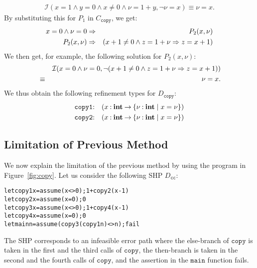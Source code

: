 \begin{eqnarray*}
\mathcal{I}(x=1 \land y=0 \land x\neq0 \land \nu=1+y,\neg \nu=x)
\equiv \nu=x.
\end{eqnarray*}
By substituting this for \(P_1\) in \(C_{\texttt{copy}}\), we get:
\begin{eqnarray*}
x=0 \land \nu=0 &\Rightarrow& P_2(x,\nu) \\
P_2(x,\nu) &\Rightarrow& (x+1\neq0 \land z=1+\nu \Rightarrow z=x+1)
\end{eqnarray*}
We then get, for example, the following solution for \(P_2(x,\nu)\):
\begin{eqnarray*}
&&\mathcal{I}(x=0 \land \nu=0,\neg (x+1\neq0 \land z=1+\nu \Rightarrow z=x+1)) \\
&\equiv& \nu=x.
\end{eqnarray*}
We thus obtain the following refinement types for \(D_{\texttt{copy}}\):
\begin{eqnarray*}
\texttt{copy1}&\mathbin{:}&(x\mathbin{:}{\mathbf{int}}\mathbin{\rightarrow}{\{{\nu\mathbin{:}\mathbf{int} \mid x=\nu}\}}) \\
\texttt{copy2}&\mathbin{:}&(x\mathbin{:}{\mathbf{int}}\mathbin{\rightarrow}{\{{\nu\mathbin{:}\mathbf{int} \mid x=\nu}\}})
\end{eqnarray*}

\subsection{Limitation of Previous Method}
\label{sec:limit}

We now explain the limitation of the previous method by using the 
program in Figure~\ref{fig:copy}.  Let us consider the following SHP 
\(D_{\texttt{cc}}\):
\begin{alltt}
let copy1 x = assume (x<>0); 1 + copy2 (x-1)
let copy2 x = assume (x=0); 0
let copy3 x = assume (x<>0); 1 + copy4 (x-1)
let copy4 x = assume (x=0); 0
let main n = assume (copy3 (copy1 n) <> n); fail
\end{alltt}
The SHP corresponds to an infeasible error path where the else-branch of
\(\texttt{copy}\) is taken in the first and the third calls of
\(\texttt{copy}\), the then-branch is taken in the second and the fourth
calls of \(\texttt{copy}\), and the assertion in the \(\texttt{main}\)
function fails.

